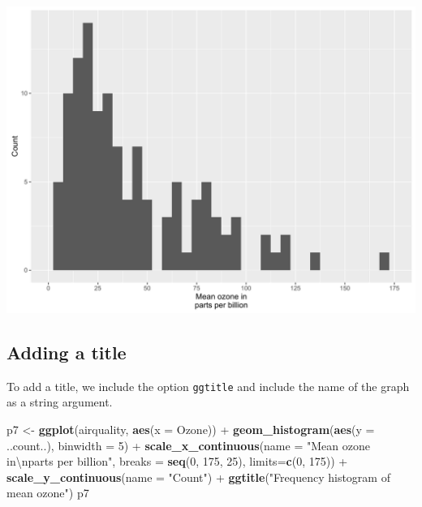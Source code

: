 \documentclass[]{article}
\newenvironment{Shaded}{\begin{snugshade}}{\end{snugshade}}
\newcommand{\KeywordTok}[1]{\textcolor[rgb]{0.13,0.29,0.53}{\textbf{{#1}}}}
\newcommand{\DataTypeTok}[1]{\textcolor[rgb]{0.13,0.29,0.53}{{#1}}}
\newcommand{\DecValTok}[1]{\textcolor[rgb]{0.00,0.00,0.81}{{#1}}}
\newcommand{\CharTok}[1]{\textcolor[rgb]{0.31,0.60,0.02}{{#1}}}
\newcommand{\StringTok}[1]{\textcolor[rgb]{0.31,0.60,0.02}{{#1}}}
\newcommand{\NormalTok}[1]{{#1}}
\begin{document}
\begin{center}\includegraphics{0_all_posts_pdf/histogram_7-1} \end{center}

\subsection{Adding a title}\label{adding-a-title}

To add a title, we include the option \texttt{ggtitle} and include the
name of the graph as a string argument.

\begin{Shaded}
\begin{Highlighting}[]
\NormalTok{p7 <-}\StringTok{ }\KeywordTok{ggplot}\NormalTok{(airquality, }\KeywordTok{aes}\NormalTok{(}\DataTypeTok{x =} \NormalTok{Ozone)) +}\StringTok{ }
\StringTok{      }\KeywordTok{geom_histogram}\NormalTok{(}\KeywordTok{aes}\NormalTok{(}\DataTypeTok{y =} \NormalTok{..count..), }\DataTypeTok{binwidth =} \DecValTok{5}\NormalTok{) +}
\StringTok{      }\KeywordTok{scale_x_continuous}\NormalTok{(}\DataTypeTok{name =} \StringTok{"Mean ozone in}\CharTok{\textbackslash{}n}\StringTok{parts per billion"}\NormalTok{,}
                         \DataTypeTok{breaks =} \KeywordTok{seq}\NormalTok{(}\DecValTok{0}\NormalTok{, }\DecValTok{175}\NormalTok{, }\DecValTok{25}\NormalTok{),}
                         \DataTypeTok{limits=}\KeywordTok{c}\NormalTok{(}\DecValTok{0}\NormalTok{, }\DecValTok{175}\NormalTok{)) +}
\StringTok{      }\KeywordTok{scale_y_continuous}\NormalTok{(}\DataTypeTok{name =} \StringTok{"Count"}\NormalTok{) +}
\StringTok{      }\KeywordTok{ggtitle}\NormalTok{(}\StringTok{"Frequency histogram of mean ozone"}\NormalTok{)}
\NormalTok{p7}
\end{Highlighting}
\end{Shaded}
\end{document}
